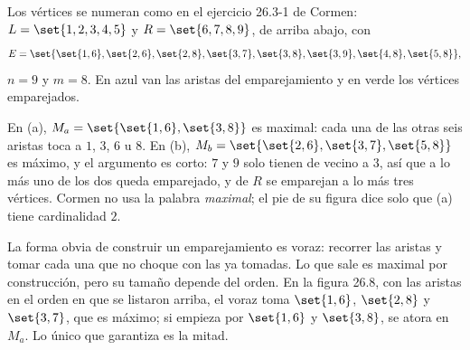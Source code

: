 \documentclass[11pt,letterpaper]{article}
\begin{document}
\begin{ejemplo}
  \label{ej:emparejamiento-cormen}
  Los vértices se numeran como en el ejercicio 26.3-1 de Cormen:
  $L = \set{1, 2, 3, 4, 5}$ y $R = \set{6, 7, 8, 9}$, de arriba
  abajo, con
  \[
    E = \set{\set{1,6}, \set{2,6}, \set{2,8}, \set{3,7}, \set{3,8},
             \set{3,9}, \set{4,8}, \set{5,8}} ,
  \]
  $n = 9$ y $m = 8$. En azul van las aristas del emparejamiento y en
  verde los vértices emparejados.
  \begin{center}
  \end{center}
  En (a), $M_a = \set{\set{1,6}, \set{3,8}}$ es maximal: cada una de
  las otras seis aristas toca a $1$, $3$, $6$ u $8$. En (b),
  $M_b = \set{\set{2,6}, \set{3,7}, \set{5,8}}$ es máximo, y el
  argumento es corto: $7$ y $9$ solo tienen de vecino a $3$, así que
  a lo más uno de los dos queda emparejado, y de $R$ se emparejan a
  lo más tres vértices. Cormen no usa la palabra \textit{maximal}; el
  pie de su figura dice solo que (a) tiene cardinalidad $2$.
\end{ejemplo}

La forma obvia de construir un emparejamiento es voraz: recorrer las
aristas y tomar cada una que no choque con las ya tomadas. Lo que
sale es maximal por construcción, pero su tamaño depende del orden.
En la figura 26.8, con las aristas en el orden en que se listaron
arriba, el voraz toma $\set{1,6}$, $\set{2,8}$ y $\set{3,7}$, que es
máximo; si empieza por $\set{1,6}$ y $\set{3,8}$, se atora en $M_a$.
Lo único que garantiza es la mitad.
\end{document}
